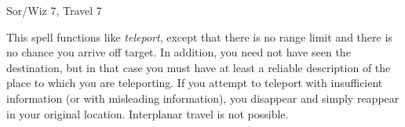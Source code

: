 
\begin{description*}
\item[Level:] Sor/Wiz 7, Travel 7
\end{description*}

This spell functions like \textit{teleport}, except that there is no range limit
and there is no chance you arrive off target. In addition, you need not have seen
the destination, but in that case you must have at least a reliable description
of the place to which you are teleporting. If you attempt to teleport with insufficient
information (or with misleading information), you disappear and simply reappear
in your original location. Interplanar travel is not possible.